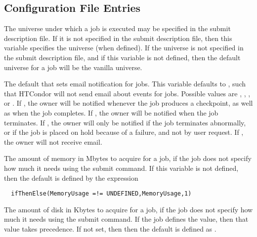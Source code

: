 \subsection{\label{sec:Submit-Config-File-Entries}
Configuration File Entries}

\begin{description}
\label{param:DefaultUniverse}
\item[\Macro{DEFAULT\_UNIVERSE}]
  The universe under which a job is executed may be specified in the submit
  description file.
  If it is not specified in the submit description file, then
  this variable specifies the universe (when defined).
  If the universe is not specified in the submit description
  file, and if this variable is not defined, then
  the default universe for a job will be the vanilla universe.

\label{param:JobDefaultNotification}
\item[\Macro{JOB\_DEFAULT\_NOTIFICATION}]
  The default that sets email notification for jobs. 
  This variable defaults to ,
  such that HTCondor will not send email about events for jobs. 
  Possible values are
  , , , or . 
  If , the owner will be notified whenever the job produces a
  checkpoint, as well as when the job completes. 
  If , the owner will be notified when the job terminates.
  If , the owner
  will only be notified if the job terminates abnormally, 
  or if the job is placed on hold because of a failure, 
  and not by user request. 
  If , the owner will not receive email. 

\label{param:JobDefaultRequestMemory}
\item[\Macro{JOB\_DEFAULT\_REQUESTMEMORY}]
  The amount of memory in Mbytes to acquire for a job, 
  if the job does not specify how much it needs using the 
   submit command.
  If this variable is not defined, then the default is defined by
  the expression
\begin{verbatim}
  ifThenElse(MemoryUsage =!= UNDEFINED,MemoryUsage,1)
\end{verbatim}

\label{param:JobDefaultRequestDisk}
\item[\Macro{JOB\_DEFAULT\_REQUESTDISK}]
  The amount of disk in Kbytes to acquire for a job,
  if the job does not specify how much it needs using the 
   submit command.
  If the job defines the value, then that value takes precedence. 
  If not set, then then the default is defined as .


\end{description}
